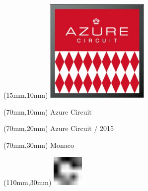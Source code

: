 \null\newpage
\begin{textblock*}{50mm}(15mm,10mm)%
\includegraphics[width=50mm]{LG/2015-05-20_00072.png}
\end{textblock*}
\begin{textblock*}{130mm}(70mm,10mm)%
{\fontsize{20}{20}\selectfont Azure Circuit}\\
\end{textblock*}
\begin{textblock*}{120mm}(70mm,20mm)%
{\fontsize{16}{16}\selectfont Azure Circuit / 2015}\\
\end{textblock*}
\begin{textblock*}{120mm}(70mm,30mm)%
{\fontsize{12}{12}\selectfont Monaco}
\end{textblock*}
\begin{textblock*}{30mm}(110mm,30mm)%
\centering
\includegraphics[height=15mm]{icons/fa-rotate-right.pdf}
\end{textblock*}
